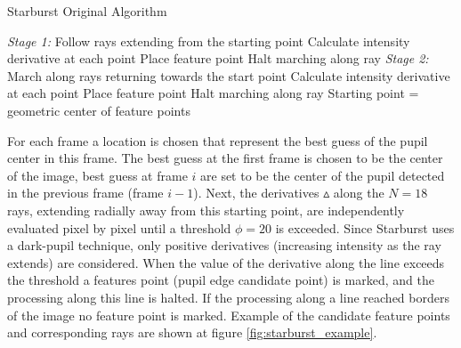 \documentclass[12pt,fleqn]{book} %
\begin{document}
\begin{algorithm}
\begin{dBox}
	\caption{Starburst Original Algorithm} \label{starburst_psuedo}
	\begin{algorithmic}[1]
			\Repeat  
				\vspace{1em}	
				\State \emph{Stage 1:}
					\State Follow rays extending from the starting point
					\State Calculate intensity derivative at each point
						\State Place feature point
						\State Halt marching along ray
					\EndIf		
				\vspace{1em}	
				\State \emph{Stage 2:}
						\State March along rays returning towards the start point
						\State Calculate intensity derivative at each point
							\State Place feature point
							\State Halt marching along ray
						\EndIf		
					\EndFor
					\vspace{.3em}			
					\State Starting point = geometric center of feature points
			\vspace{1em}							
		\EndProcedure	
	\end{algorithmic}
\end{dBox}	
\end{algorithm}

For each frame a location is chosen that represent the best guess of the pupil center in this frame. The best guess at the first frame is chosen to be the center of the image, best guess at frame $i$ are set to be the center of the pupil detected in the previous frame (frame $i-1$).  Next, the derivatives $\vartriangle$ along the $N = 18$ rays, extending radially away from this starting point, are independently evaluated pixel by pixel until a threshold $\phi = 20$ is exceeded. Since Starburst uses a dark-pupil technique, only positive derivatives (increasing intensity as the ray extends) are considered. When the value of the derivative along the line exceeds the threshold a features point (pupil edge candidate point) is marked, and the processing along this line is halted. If the processing along a line reached borders of the image no feature point is marked. Example of the candidate feature points and corresponding rays are shown at figure \ref{fig:starburst_example}. \bigskip
\end{document}
